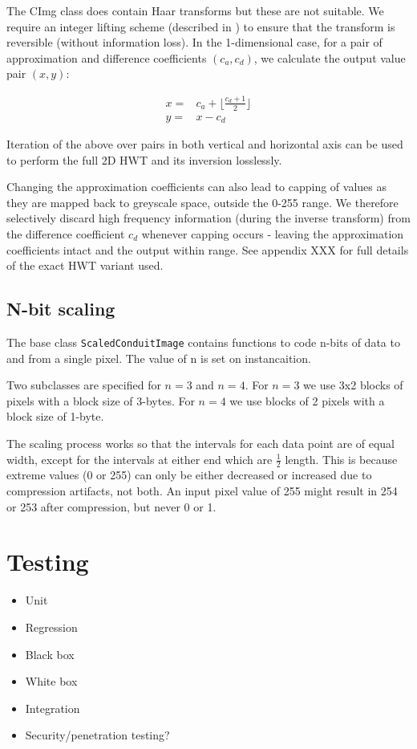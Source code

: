 The CImg class does contain Haar transforms but these are not suitable. We require an integer lifting scheme (described in \cite{XXX}) to ensure that the transform is reversible (without information loss). In the 1-dimensional case, for a pair of approximation and difference coefficients $(c_a,c_d)$, we calculate the output value pair $(x,y)$: 

\begin{eqnarray}
    x = & c_a + \lfloor \frac{c_d+1}{2} \rfloor \nonumber \\ 
    y = & x - c_d
\end{eqnarray}

Iteration of the above over pairs in both vertical and horizontal axis can be used to perform the full 2D HWT and its inversion losslessly.

Changing the approximation coefficients can also lead to capping of values as they are mapped back to greyscale space, outside the 0-255 range. We therefore selectively discard high frequency information (during the inverse transform) from the difference coefficient $c_d$ whenever capping occurs - leaving the approximation coefficients intact and the output within range. See appendix XXX for full details of the exact HWT variant used.


\FloatBarrier
\subsection{N-bit scaling}

The base class {\tt ScaledConduitImage} contains functions to code n-bits of data to and from a single pixel. The value of n is set on instancaition.

Two subclasses are specified for $n=3$ and $n=4$. For $n=3$ we use 3x2 blocks of pixels with a block size of 3-bytes. For $n=4$ we use blocks of 2 pixels with a block size of 1-byte.

The scaling process works so that the intervals for each data point are of equal width, except for the intervals at either end which are $\frac{1}{2}$ length. This is because extreme values (0 or 255) can only be either decreased or increased due to compression artifacts, not both. An input pixel value of 255 might result in 254 or 253 after compression, but never 0 or 1.


\FloatBarrier
\section{Testing}
    \begin{itemize}
        \item Unit
        \item Regression
        \item Black box
        \item White box
        \item Integration
        \item Security/penetration testing?
    \end{itemize}
    
